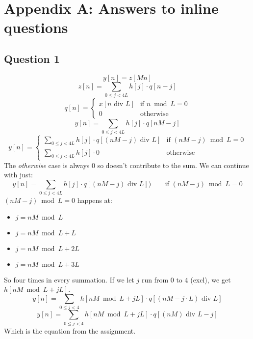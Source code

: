 \section{Appendix A: Answers to inline questions}
\subsection{Question 1}
\begin{equation*}
y[n] = z[Mn]
\end{equation*}
\begin{equation*}
z[n] = \sum_{0\leq j < 4L} h[j] \cdot q[n-j]
\end{equation*}
\begin{equation*}
q[n] = \begin{cases}
x[n \text{ div } L]&\text{if } n \bmod L = 0\\
0&\text{otherwise}
\end{cases}
\end{equation*}
\begin{equation*}
y[n] = \sum_{0\leq j<4L} h[j] \cdot q[nM-j]
\end{equation*}
\begin{equation*}
y[n] = \begin{cases}
\sum_{0 \leq j < 4L} h[j] \cdot q[(nM-j) \text{ div } L]&\text{if } (nM - j) \bmod L = 0\\
\sum_{0 \leq j < 4L} h[j] \cdot 0 &\text{otherwise}
\end{cases}
\end{equation*}
The \emph{otherwise} case is always 0 so doesn't contribute to the sum.
We can continue with just:
\begin{equation*}
y[n] = \sum_{0\leq j<4L} h[j] \cdot q[(nM-j) \text{ div } L])  \phantom{xxx}\text{ if } (nM-j) \bmod L = 0
\end{equation*}
$(nM-j) \bmod L = 0$  happens at:
\begin{itemize}
\item $  j = nM \bmod L$
\item $  j = nM \bmod L + L$
\item $  j = nM \bmod L + 2L$
\item $  j = nM \bmod L + 3L$
\end{itemize}
So four times in every summation. If we let $j$ run from $0$ to $4$ (excl),
we get $h[nM \bmod L + jL]$.
\begin{equation*}
y[n] = \sum_{0\leq j<4} h[nM \bmod L + jL] \cdot q[(nM-j \cdot L) \text{ div } L]
\end{equation*}
\begin{equation*}
y[n] = \sum_{0\leq j<4} h[nM \bmod L + jL] \cdot q[(nM) \text{ div } L - j]
\end{equation*}
Which is the equation from the assignment. 

